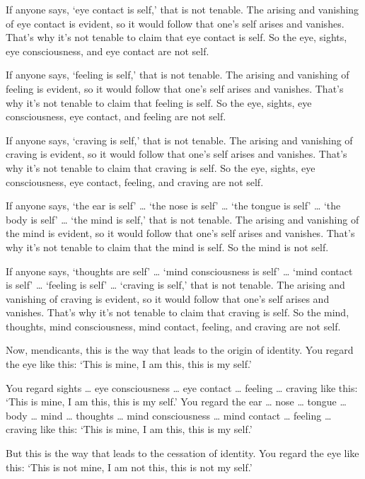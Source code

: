 \documentclass[12pt,openany]{book}%
\begin{document}
If anyone says, ‘eye contact is self,’ that is not tenable. The arising and vanishing of eye contact is evident, so it would follow that one’s self arises and vanishes. That’s why it’s not tenable to claim that eye contact is self. So the eye, sights, eye consciousness, and eye contact are not self. 

If anyone says, ‘feeling is self,’ that is not tenable. The arising and vanishing of feeling is evident, so it would follow that one’s self arises and vanishes. That’s why it’s not tenable to claim that feeling is self. So the eye, sights, eye consciousness, eye contact, and feeling are not self. 

If anyone says, ‘craving is self,’ that is not tenable. The arising and vanishing of craving is evident, so it would follow that one’s self arises and vanishes. That’s why it’s not tenable to claim that craving is self. So the eye, sights, eye consciousness, eye contact, feeling, and craving are not self. 

If anyone says, ‘the ear is self’ … ‘the nose is self’ … ‘the tongue is self’ … ‘the body is self’ … ‘the mind is self,’ that is not tenable. The arising and vanishing of the mind is evident, so it would follow that one’s self arises and vanishes. That’s why it’s not tenable to claim that the mind is self. So the mind is not self. 

If anyone says, ‘thoughts are self’ … ‘mind consciousness is self’ … ‘mind contact is self’ … ‘feeling is self’ … ‘craving is self,’ that is not tenable. The arising and vanishing of craving is evident, so it would follow that one’s self arises and vanishes. That’s why it’s not tenable to claim that craving is self. So the mind, thoughts, mind consciousness, mind contact, feeling, and craving are not self. 

Now, mendicants, this is the way that leads to the origin of identity. You regard the eye like this: ‘This is mine, I am this, this is my self.’ 

You regard sights … eye consciousness … eye contact … feeling … craving like this: ‘This is mine, I am this, this is my self.’ You regard the ear … nose … tongue … body … mind … thoughts … mind consciousness … mind contact … feeling … craving like this: ‘This is mine, I am this, this is my self.’ 

But this is the way that leads to the cessation of identity. You regard the eye like this: ‘This is not mine, I am not this, this is not my self.’ 
\end{document}
